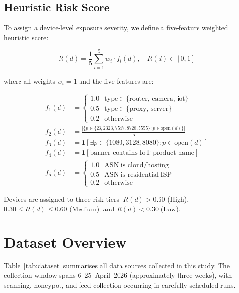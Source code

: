 \documentclass[journal]{IEEEtran}
\begin{document}
\subsection{Heuristic Risk Score}
\label{sec:risk_score}

To assign a device-level exposure severity, we define a five-feature
weighted heuristic score:

\begin{equation}
  R(d) = \frac{1}{5} \sum_{i=1}^{5} w_i \cdot f_i(d), \quad R(d) \in [0,1]
  \label{eq:risk}
\end{equation}

\noindent where all weights $w_i = 1$ and the five features are:

\begin{align}
  f_1(d) &= \begin{cases} 1.0 & \text{type} \in \{\text{router, camera, iot}\} \\
                          0.5 & \text{type} \in \{\text{proxy, server}\} \\
                          0.2 & \text{otherwise} \end{cases} \nonumber \\
  f_2(d) &= \tfrac{|\{p \in \{23,2323,7547,8728,5555\} : p \in \text{open}(d)\}|}{5} \nonumber \\
  f_3(d) &= \mathbf{1}[\exists p \in \{1080,3128,8080\} : p \in \text{open}(d)] \nonumber \\
  f_4(d) &= \mathbf{1}[\text{banner contains IoT product name}] \nonumber \\
  f_5(d) &= \begin{cases} 1.0 & \text{ASN is cloud/hosting} \\
                          0.5 & \text{ASN is residential ISP} \\
                          0.2 & \text{otherwise} \end{cases} \nonumber
\end{align}

Devices are assigned to three risk tiers:
$R(d) > 0.60$ (High), $0.30 \leq R(d) \leq 0.60$ (Medium),
and $R(d) < 0.30$ (Low).


\section{Dataset Overview}
\label{sec:dataset}

Table~\ref{tab:dataset} summarises all data sources collected in this study.
The collection window spans 6--25~April~2026 (approximately three weeks), with
scanning, honeypot, and feed collection occurring in carefully scheduled runs.
\end{document}
